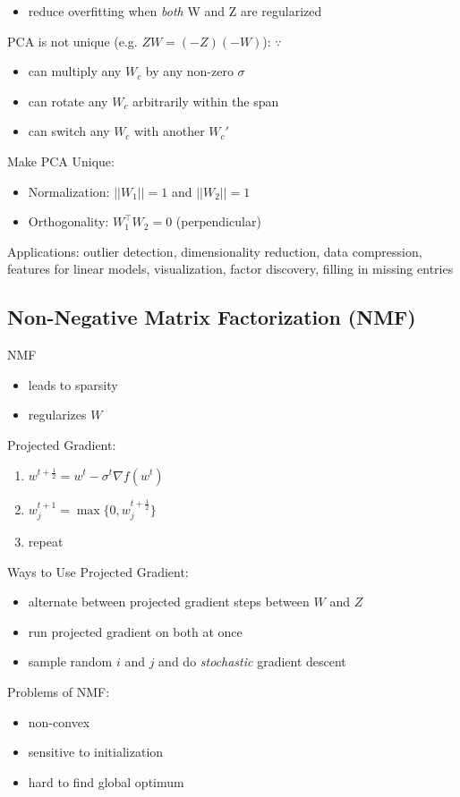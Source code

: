 \documentclass[10pt,landscape,a4paper]{article}
\begin{document}
\begin{multicols*}{5}
\begin{itemize}
    \item reduce overfitting when \emph{both} W and Z are regularized
\end{itemize}
PCA is not unique (e.g. \(ZW = (-Z)(-W)\)): \(\because\)
\begin{itemize}
    \item can multiply any \(W_c\) by any non-zero \(\sigma\)
    \item can rotate any \(W_c\) arbitrarily within the span
    \item can switch any \(W_c\) with another \(W_c'\)
\end{itemize}
Make PCA Unique:
\begin{itemize}
    \item Normalization: \(||W_1|| = 1\) and \(||W_2|| = 1\)
    \item Orthogonality: \(W_1^\intercal W_2 = 0\) (perpendicular)
\end{itemize}
Applications: outlier detection, dimensionality reduction, data compression, features for linear models, visualization, factor discovery, filling in missing entries \\

\subsection{Non-Negative Matrix Factorization (NMF)}
NMF
\begin{itemize}
    \item leads to sparsity
    \item regularizes \(W\)
\end{itemize}
Projected Gradient:
\begin{enumerate}
    \item \(w^{t+\frac{1}{2}} = w^t - \sigma^t \nabla f(w^t)\)
    \item \(w_j^{t+1} = \max \{0, w_j^{t+\frac{1}{2}}\} \)
    \item repeat
\end{enumerate}
Ways to Use Projected Gradient:
\begin{itemize}
    \item alternate between projected gradient steps between \(W\) and \(Z\)
    \item run projected gradient on both at once
    \item sample random \(i\) and \(j\) and do \emph{stochastic} gradient descent
\end{itemize}
Problems of NMF:
\begin{itemize}
    \item non-convex
    \item sensitive to initialization
    \item hard to find global optimum
\end{itemize}


\end{multicols*}
\end{document}
